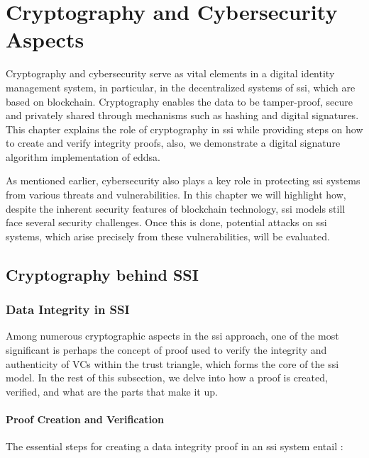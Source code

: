 \chapter{Cryptography and Cybersecurity Aspects} \label{ch:security}

Cryptography and cybersecurity serve as vital elements in a digital identity management system, in particular, in the decentralized systems of \gls{ssi},
which are based on blockchain. Cryptography enables the data to be tamper-proof, secure and privately shared through mechanisms such as hashing and digital signatures. This 
chapter explains the role of cryptography in \gls{ssi} while providing steps on how to create and verify integrity proofs, also, we demonstrate a digital signature 
algorithm implementation of \gls{eddsa}.

As mentioned earlier, cybersecurity also plays a key role in protecting \gls{ssi} systems from various threats and vulnerabilities. In this chapter we will highlight how, despite 
the inherent security features of blockchain technology, \gls{ssi} models still face several security challenges. Once this is done, potential attacks on \gls{ssi} systems, which arise 
precisely from these vulnerabilities, will be evaluated.

\section{Cryptography behind SSI}

\subsection{Data Integrity in SSI}

Among numerous cryptographic aspects in the \gls{ssi} approach, one of the most significant is perhaps the concept of proof used to verify the integrity and authenticity of VCs 
within the trust triangle, which forms the core of the \gls{ssi} model. In the rest of this subsection, we delve into how a proof is created, verified, and what are the parts 
that make it up.

\subsubsection{Proof Creation and Verification}

The essential steps for creating a data integrity proof in an \gls{ssi} system entail \cite{VCDataIntegrity}: 

